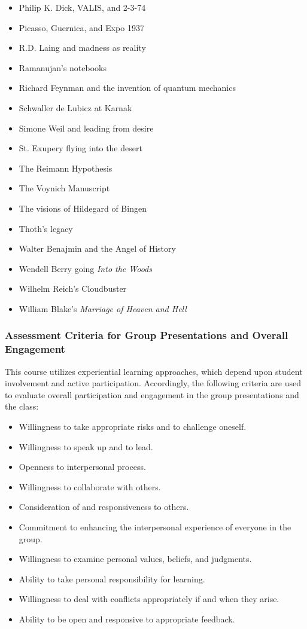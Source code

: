 \documentclass[letterpaper,10pt,headsepline]{scrreprt}
\begin{document}
\begin{itemize}
\item Philip K. Dick, VALIS, and 2-3-74
\item Picasso, Guernica, and Expo 1937
\item R.D. Laing and madness as reality
\item Ramanujan's notebooks
\item Richard Feynman and the invention of quantum mechanics
\item Schwaller de Lubicz at Karnak
\item Simone Weil and leading from desire
\item St. Exupery flying into the desert
\item The Reimann Hypothesis
\item The Voynich Manuscript
\item The visions of Hildegard of Bingen
\item Thoth's legacy
\item Walter Benajmin and the Angel of History
\item Wendell Berry going \textit{Into the Woods}
\item Wilhelm Reich's Cloudbuster
\item William Blake's \textit{Marriage of Heaven and Hell}

\end{itemize}


\subsubsection{Assessment Criteria for Group Presentations and Overall Engagement}

This course utilizes experiential learning approaches, which depend upon student involvement and active participation. Accordingly, the following criteria are used to evaluate overall participation and engagement in the group presentations and the class:

\begin{itemize}
\item Willingness to take appropriate risks and to challenge oneself.
\item Willingness to speak up and to lead.
\item Openness to interpersonal process.
\item Willingness to collaborate with others.
\item Consideration of and responsiveness to others.
\item Commitment to enhancing the interpersonal experience of everyone in the group.
\item Willingness to examine personal values, beliefs, and judgments.
\item Ability to take personal responsibility for learning.
\item Willingness to deal with conflicts appropriately if and when they arise.
\item Ability to be open and responsive to appropriate feedback.
 
\end{itemize}
\end{document}
